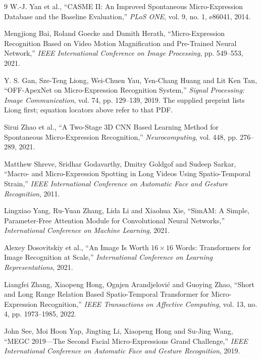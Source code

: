 \documentclass[11pt,a4paper]{article}
\numberwithin{equation}{section}
\begin{document}
\begin{thebibliography}{9}
W.-J. Yan et al., ``CASME II: An Improved Spontaneous Micro-Expression Database
and the Baseline Evaluation,'' \emph{PLoS ONE}, vol. 9, no. 1, e86041, 2014.

Mengjiong Bai, Roland Goecke and Damith Herath, ``Micro-Expression Recognition
Based on Video Motion Magnification and Pre-Trained Neural Network,''
\emph{IEEE International Conference on Image Processing}, pp. 549--553, 2021.

Y. S. Gan, Sze-Teng Liong, Wei-Chuen Yau, Yen-Chang Huang and Lit Ken Tan,
``OFF-ApexNet on Micro-Expression Recognition System,''
\emph{Signal Processing: Image Communication}, vol. 74, pp. 129--139, 2019.
The supplied preprint lists Liong first; equation locators above refer to that PDF.

Sirui Zhao et al., ``A Two-Stage 3D CNN Based Learning Method for Spontaneous
Micro-Expression Recognition,'' \emph{Neurocomputing}, vol. 448,
pp. 276--289, 2021.

Matthew Shreve, Sridhar Godavarthy, Dmitry Goldgof and Sudeep Sarkar,
``Macro- and Micro-Expression Spotting in Long Videos Using Spatio-Temporal
Strain,'' \emph{IEEE International Conference on Automatic Face and Gesture
Recognition}, 2011.

Lingxiao Yang, Ru-Yuan Zhang, Lida Li and Xiaohua Xie,
``SimAM: A Simple, Parameter-Free Attention Module for Convolutional Neural
Networks,'' \emph{International Conference on Machine Learning}, 2021.

Alexey Dosovitskiy et al., ``An Image Is Worth $16\times16$ Words:
Transformers for Image Recognition at Scale,''
\emph{International Conference on Learning Representations}, 2021.

Liangfei Zhang, Xiaopeng Hong, Ognjen Arandjelovi{\'c} and Guoying Zhao,
``Short and Long Range Relation Based Spatio-Temporal Transformer for
Micro-Expression Recognition,'' \emph{IEEE Transactions on Affective
Computing}, vol. 13, no. 4, pp. 1973--1985, 2022.

John See, Moi Hoon Yap, Jingting Li, Xiaopeng Hong and Su-Jing Wang,
``MEGC 2019---The Second Facial Micro-Expressions Grand Challenge,''
\emph{IEEE International Conference on Automatic Face and Gesture
Recognition}, 2019.
\end{thebibliography}
\end{document}
